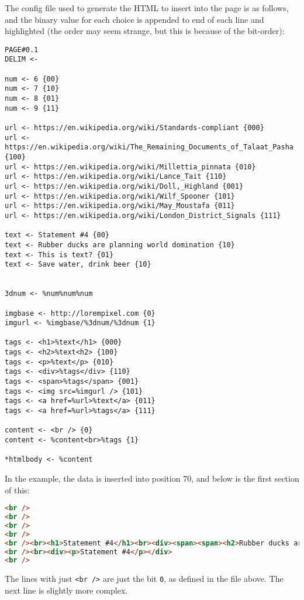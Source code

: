 The config file used to generate the HTML to insert into the page is as follows, and the binary value for each choice is appended to end of each line and highlighted (the order may seem strange, but this is because of the bit-order):
\begin{lstlisting}[language=pagefile]
PAGE#0.1
DELIM <-

num <- 6 {00}
num <- 7 {10}
num <- 8 {01} 
num <- 9 {11}

url <- https://en.wikipedia.org/wiki/Standards-compliant {000}
url <- https://en.wikipedia.org/wiki/The_Remaining_Documents_of_Talaat_Pasha {100}
url <- https://en.wikipedia.org/wiki/Millettia_pinnata {010}
url <- https://en.wikipedia.org/wiki/Lance_Tait {110}
url <- https://en.wikipedia.org/wiki/Doll,_Highland {001}
url <- https://en.wikipedia.org/wiki/Wilf_Spooner {101}
url <- https://en.wikipedia.org/wiki/May_Moustafa {011}
url <- https://en.wikipedia.org/wiki/London_District_Signals {111}

text <- Statement #4 {00}
text <- Rubber ducks are planning world domination {10}
text <- This is text? {01}
text <- Save water, drink beer {10}


3dnum <- %num%num%num

imgbase <- http://lorempixel.com {0}
imgurl <- %imgbase/%3dnum/%3dnum {1}

tags <- <h1>%text</h1> {000}
tags <- <h2>%text<h2> {100}
tags <- <p>%text</p> {010}
tags <- <div>%tags</div> {110}
tags <- <span>%tags</span> {001}
tags <- <img src=%imgurl /> {101}
tags <- <a href=%url>%text</a> {011}
tags <- <a href=%url>%tags</a> {111}

content <- <br /> {0}
content <- %content<br>%tags {1}

*htmlbody <- %content
\end{lstlisting}
In the example, the data is inserted into position 70, and below is the first section of this:
\begin{lstlisting}[language=HTML,numbers=none]
<br />
<br />
<br />
<br />
<br /><br><h1>Statement #4</h1><br><div><span><span><h2>Rubber ducks are planning world domination<h2></span></span></div>
<br /><br><div><p>Statement #4</p></div>
<br />
\end{lstlisting}
The lines with just \texttt{<br />} are just the bit \texttt{0}, as defined in the file above.
The next line is slightly more complex.
